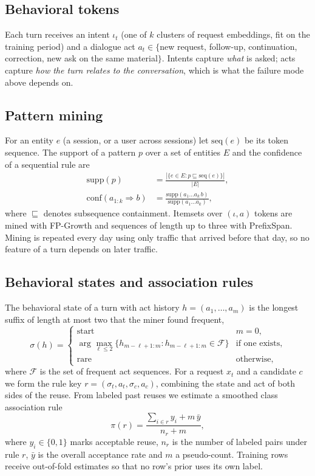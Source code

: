 \documentclass[conference]{IEEEtran}
\begin{document}
\subsection{Behavioral tokens}
Each turn receives an intent $\iota_t$ (one of $k$ clusters of request embeddings, fit on the training period) and a dialogue act $a_t \in \{$new request, follow-up, continuation, correction, new ask on the same material$\}$. Intents capture \emph{what} is asked; acts capture \emph{how the turn relates to the conversation}, which is what the failure mode above depends on.

\subsection{Pattern mining}
For an entity $e$ (a session, or a user across sessions) let $\mathrm{seq}(e)$ be its token sequence. The support of a pattern $p$ over a set of entities $E$ and the confidence of a sequential rule are
\begin{align}
\mathrm{supp}(p) &= \frac{|\{e\in E : p \sqsubseteq \mathrm{seq}(e)\}|}{|E|}, \label{eq:supp}\\
\mathrm{conf}(a_{1:k} \Rightarrow b) &= \frac{\mathrm{supp}(a_1 \dots a_k\, b)}{\mathrm{supp}(a_1 \dots a_k)}, \label{eq:conf}
\end{align}
where $\sqsubseteq$ denotes subsequence containment. Itemsets over $(\iota,a)$ tokens are mined with FP-Growth and sequences of length up to three with PrefixSpan. Mining is repeated every day using only traffic that arrived before that day, so no feature of a turn depends on later traffic.

\subsection{Behavioral states and association rules}
The behavioral state of a turn with act history $h=(a_1,\dots,a_m)$ is the longest suffix of length at most two that the miner found frequent,
\begin{equation}
\sigma(h) = \begin{cases} \text{start} & m=0,\\ \arg\max_{\ell\le 2}\{h_{m-\ell+1:m} : h_{m-\ell+1:m}\in\mathcal{F}\} & \text{if one exists},\\ \text{rare} & \text{otherwise}, \end{cases}
\end{equation}
where $\mathcal{F}$ is the set of frequent act sequences. For a request $x_t$ and a candidate $c$ we form the rule key $r=(\sigma_t, a_t, \sigma_c, a_c)$, combining the state and act of both sides of the reuse. From labeled past reuses we estimate a smoothed class association rule~\cite{liu1998cba}
\begin{equation}
\pi(r) = \frac{\sum_{i\in r} y_i + m\,\bar y}{n_r + m}, \label{eq:rule}
\end{equation}
where $y_i\in\{0,1\}$ marks acceptable reuse, $n_r$ is the number of labeled pairs under rule $r$, $\bar y$ is the overall acceptance rate and $m$ a pseudo-count. Training rows receive out-of-fold estimates so that no row's prior uses its own label.
\end{document}
